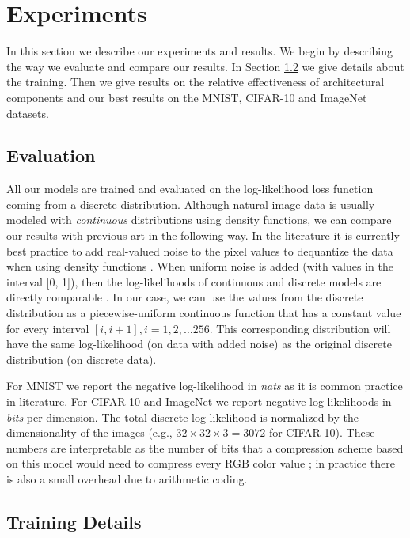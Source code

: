

\section{Experiments}
\label{sect:experiments}

In this section we describe our experiments and results.  We begin by describing the way we evaluate and compare our results. In Section \ref{sect:training_details} we give details about the training. Then we give results on the relative effectiveness of architectural components and our best results on the MNIST, CIFAR-10 and ImageNet datasets.

\subsection{Evaluation}

All our models are trained and evaluated on the log-likelihood loss function coming from a discrete distribution.
Although natural image data is usually modeled with \emph{continuous} distributions using density functions, we can compare our results with previous art in the following way. In the literature it is currently best practice to add real-valued noise to the pixel values to dequantize the data when using density functions \cite{uria2013rnade}. When uniform noise is added (with values in the interval [0, 1]), then the log-likelihoods of continuous and discrete models are directly comparable \cite{theis2015note}. In our case, we can use the values from the discrete distribution as a piecewise-uniform continuous function that has a constant value for every interval $[i, i+1], i = 1, 2, \dots 256$. This corresponding distribution will have the same log-likelihood (on data with added noise) as the original discrete distribution (on discrete data). 

For MNIST we report the negative log-likelihood in \emph{nats} as it is common practice in literature. For CIFAR-10 and ImageNet we report negative log-likelihoods in \emph{bits} per dimension. The total discrete log-likelihood is normalized by the dimensionality of the images (e.g., $32\times 32\times 3=3072$ for CIFAR-10). These numbers are interpretable as the number of bits that a compression scheme based on this model would need to compress every RGB color value \mbox{\citep{van2014student, theis2015note}}; in practice there is also a small overhead due to arithmetic coding.


\subsection{Training Details}
\label{sect:training_details}

